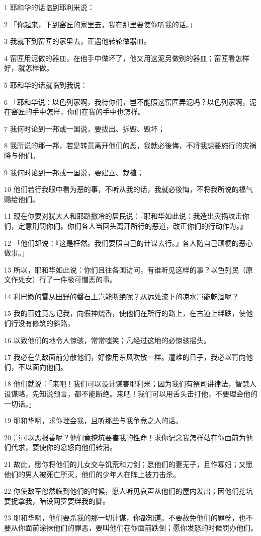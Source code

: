 \par 1 耶和华的话临到耶利米说：
\par 2 「你起来，下到窑匠的家里去，我在那里要使你听我的话。」
\par 3 我就下到窑匠的家里去，正遇他转轮做器皿。
\par 4 窑匠用泥做的器皿，在他手中做坏了，他又用这泥另做别的器皿；窑匠看怎样好，就怎样做。
\par 5 耶和华的话就临到我说：
\par 6 「耶和华说：以色列家啊，我待你们，岂不能照这窑匠弄泥吗？以色列家啊，泥在窑匠的手中怎样，你们在我的手中也怎样。
\par 7 我何时论到一邦或一国说，要拔出、拆毁、毁坏；
\par 8 我所说的那一邦，若是转意离开他们的恶，我就必後悔，不将我想要施行的灾祸降与他们。
\par 9 我何时论到一邦或一国说，要建立、栽植；
\par 10 他们若行我眼中看为恶的事，不听从我的话，我就必後悔，不将我所说的福气赐给他们。
\par 11 现在你要对犹大人和耶路撒冷的居民说：『耶和华如此说：我造出灾祸攻击你们，定意刑罚你们。你们各人当回头离开所行的恶道，改正你们的行动作为。』
\par 12 「他们却说：『这是枉然。我们要照自己的计谋去行。』各人随自己顽梗的恶心做事。」
\par 13 所以，耶和华如此说：你们且往各国访问，有谁听见这样的事？以色列民（原文作处女）行了一件极可憎恶的事。
\par 14 利巴嫩的雪从田野的磐石上岂能断绝呢？从远处流下的凉水岂能乾涸呢？
\par 15 我的百姓竟忘记我，向假神烧香，使他们在所行的路上，在古道上绊跌，使他们行没有修筑的斜路，
\par 16 以致他们的地令人惊骇，常常嗤笑；凡经过这地的必惊骇摇头。
\par 17 我必在仇敌面前分散他们，好像用东风吹散一样。遭难的日子，我必以背向他们，不以面向他们。
\par 18 他们就说：「来吧！我们可以设计谋害耶利米；因为我们有祭司讲律法，智慧人设谋略，先知说预言，都不能断绝。来吧！我们可以用舌头击打他，不要理会他的一切话。」
\par 19 耶和华啊，求你理会我，且听那些与我争竞之人的话。
\par 20 岂可以恶报善呢？他们竟挖坑要害我的性命！求你记念我怎样站在你面前为他们代求，要使你的忿怒向他们转消。
\par 21 故此，愿你将他们的儿女交与饥荒和刀剑；愿他们的妻无子，且作寡妇；又愿他们的男人被死亡所灭，他们的少年人在阵上被刀击杀。
\par 22 你使敌军忽然临到他们的时候，愿人听见哀声从他们的屋内发出；因他们挖坑要捉拿我，暗设网罗要绊我的脚。
\par 23 耶和华啊，他们要杀我的那一切计谋，你都知道。不要赦免他们的罪孽，也不要从你面前涂抹他们的罪恶，要叫他们在你面前跌倒；愿你发怒的时候罚办他们。


